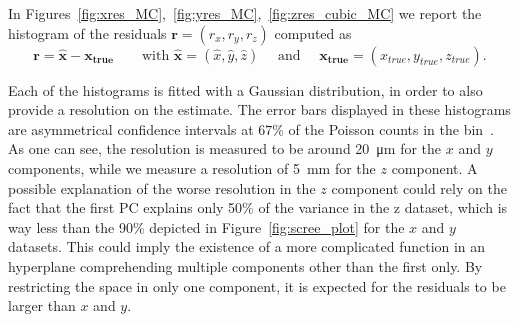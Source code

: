 In Figures~\ref{fig:xres_MC},~\ref{fig:yres_MC},~\ref{fig:zres_cubic_MC} we report the histogram of the residuals $\mathbf{r}=(r_x, r_y, r_z)$ computed as 
 \begin{equation}
     \mathbf{r}=\hat{\mathbf{x}} - \mathbf{x_{true}} \qquad \text{with } \hat{\mathbf{x}} = (\hat{x}, \hat{y}, \hat{z}) \quad \text{ and } \quad \mathbf{x_{true}}=(x_{true}, y_{true}, z_{true}).
 \end{equation}

 Each of the histograms is fitted with a Gaussian distribution, in order to also provide a resolution on the estimate. The error bars displayed in these histograms are asymmetrical confidence intervals at $67$\% of the Poisson counts in the bin~\cite{c91e9970-216b-3ca1-adc9-c0f78fd16662}.
 As one can see, the resolution is measured to be around \SI{20}{\micro\meter} for the $x$ and $y$ components, while we measure a resolution of \SI{5}{\milli\meter} for the $z$ component. A possible explanation of the worse resolution in the $z$ component could rely on the fact that the first PC explains only 50\% of the variance in the z dataset, which is way less than the 90\% depicted in Figure~\ref{fig:scree_plot} for the $x$ and $y$ datasets. This could imply the existence of a more complicated function in an hyperplane comprehending multiple components other than the first only. By restricting the space in only one component, it is expected for the residuals to be larger than $x$ and $y$.

